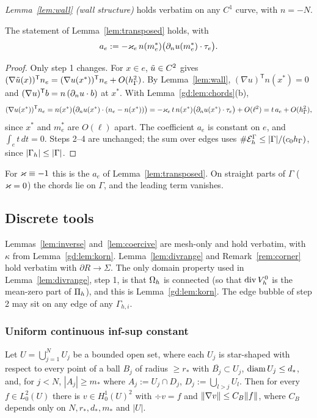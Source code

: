 \emph{Lemma~\ref{lem:wall} (wall structure)} holds verbatim on any $C^1$ curve, with $n=-N$.

\begin{lemma}\label{gd:lem:transposed}
The statement of Lemma~\ref{lem:transposed} holds, with
\[
a_e:=-\varkappa_e\,n(m_e^\ast)\bigl(\partial_n u(m_e^\ast)\cdot\tau_e\bigr).
\]
\end{lemma}

\begin{proof}
Only step 1 changes. For $x\in e$, $\tilde u\in C^2$ gives $(\nabla\tilde u(x))^{\mathsf T}n_e=(\nabla u(x^\ast))^{\mathsf T}n_e+O(h_\Gamma^2)$. By Lemma~\ref{lem:wall}, $(\nabla u)^{\mathsf T}n(x^\ast)=0$ and $(\nabla u)^{\mathsf T}b=n\,(\partial_n u\cdot b)$ at $x^\ast$. With Lemma~\ref{gd:lem:chords}(b),
\[
(\nabla u(x^\ast))^{\mathsf T}n_e=n(x^\ast)\bigl(\partial_n u(x^\ast)\cdot(n_e-n(x^\ast))\bigr)=-\varkappa_e\,t\,n(x^\ast)\bigl(\partial_n u(x^\ast)\cdot\tau_e\bigr)+O(\ell^2)=t\,a_e+O(h_\Gamma^2),
\]
since $x^\ast$ and $m_e^\ast$ are $O(\ell)$ apart. The coefficient $a_e$ is constant on $e$, and $\int_et\,dt=0$. Steps 2--4 are unchanged; the sum over edges uses $\#\mathcal E_h^\Gamma\le|\Gamma|/(c_0h_\Gamma)$, since $|\Gamma_h|\le|\Gamma|$.
\end{proof}
For $\varkappa\equiv-1$ this is the $a_e$ of Lemma~\ref{lem:transposed}. On straight parts of $\Gamma$ ($\varkappa=0$) the chords lie on $\Gamma$, and the leading term vanishes.

\subsection{Discrete tools}\label{gd:sec:discrete}

Lemmas~\ref{lem:inverse} and~\ref{lem:coercive} are mesh-only and hold verbatim, with $\kappa$ from Lemma~\ref{gd:lem:korn}. Lemma~\ref{lem:divrange} and Remark~\ref{rem:corner} hold verbatim with $\partial R\to\Sigma$. The only domain property used in Lemma~\ref{lem:divrange}, step 1, is that $\Omega_h$ is connected (so that $\operatorname{div}V_h^0$ is the mean-zero part of $\Pi_h$), and this is Lemma~\ref{gd:lem:korn}. The edge bubble of step 2 may sit on any edge of any $\Gamma_{h,i}$.

\subsubsection{Uniform continuous inf-sup constant}
\begin{lemma}\label{gd:lem:bog}
Let $U=\bigcup_{j=1}^NU_j$ be a bounded open set, where each $U_j$ is star-shaped with respect to every point of a ball $B_j$ of radius $\ge r_\ast$ with $\overline{B_j}\subset U_j$, $\operatorname{diam} U_j\le d_\ast$, and, for $j<N$, $|A_j|\ge m_\ast$ where $A_j:=U_j\cap D_j$, $D_j:=\bigcup_{l>j}U_l$. Then for every $f\in L^2_0(U)$ there is $v\in H^1_0(U)^2$ with $\div v=f$ and $\lVert \nabla v\rVert\le C_B\lVert f\rVert$, where $C_B$ depends only on $N,r_\ast,d_\ast,m_\ast$ and $|U|$.
\end{lemma}

